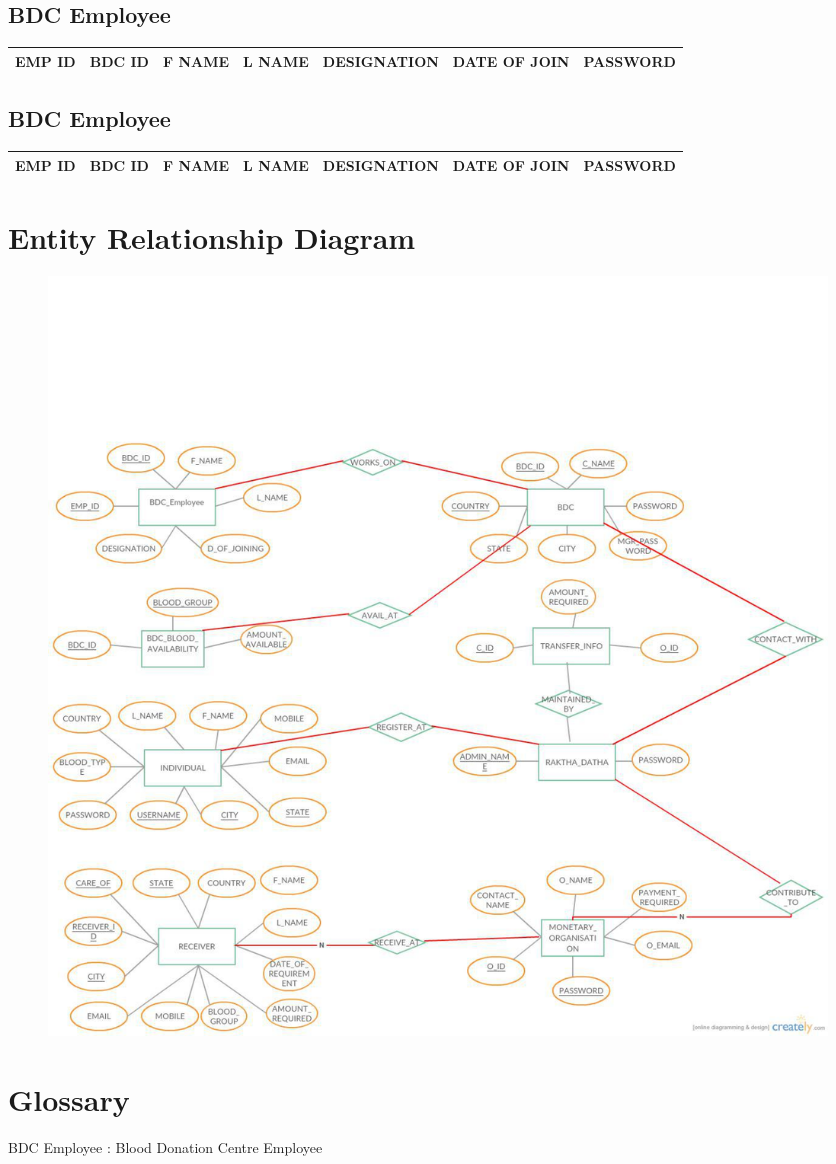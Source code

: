 \subsection{BDC Employee}

\begin{tabular}{ | c | c | c | c | c | c | c | }
 \hline
 EMP ID & BDC ID & F NAME & L NAME & DESIGNATION & DATE OF JOIN & PASSWORD \\
 \hline
\end{tabular}

\subsection{BDC Employee}

\begin{tabular}{ | c | c | c | c | c | c | c | }
 \hline
 EMP ID & BDC ID & F NAME & L NAME & DESIGNATION & DATE OF JOIN & PASSWORD \\
 \hline
\end{tabular}


\section{Entity Relationship Diagram}
\begin{figure}[htb]
\centering
\includegraphics[scale=0.3]{./er} %
\label{fig:label} %
\end{figure}

\section{Glossary}
BDC Employee : Blood Donation Centre Employee
